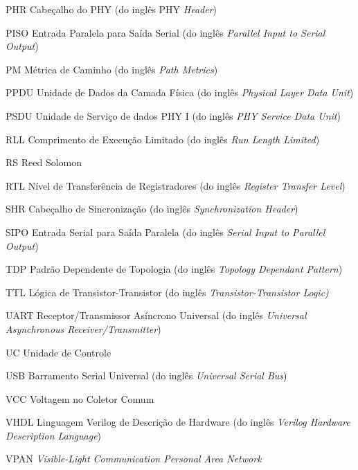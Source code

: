 \documentclass[
	12pt,				%
	openright,			%
	oneside,			%
	a4paper,			%
	hyphens,			%
	english,			%
	brazil				%
]{abntex2}
\begin{document}
\begin{siglas}
		\item[PHR] Cabeçalho do PHY (do inglês PHY \emph{Header})
		\item[PISO] Entrada Paralela para Saída Serial (do inglês \emph{Parallel Input to Serial Output})
		\item[PM] Métrica de Caminho (do inglês \emph{Path Metrics})
		\item[PPDU] Unidade de Dados da Camada Física (do inglês \emph{Physical Layer Data Unit})
		\item[PSDU] Unidade de Serviço de dados PHY I (do inglês \emph{PHY Service Data Unit})
		\item[RLL] Comprimento de Execução Limitado (do inglês \emph{Run Length Limited})
		\item[RS] Reed Solomon
		\item[RTL] Nível de Transferência de Registradores (do inglês \emph{Register Transfer Level})
		\item[SHR] Cabeçalho de Sincronização (do inglês \emph{Synchronization Header})
		\item[SIPO] Entrada Serial para Saída Paralela (do inglês \emph{Serial Input to Parallel Output})
		\item[TDP] Padrão Dependente de Topologia (do inglês \emph{Topology Dependant Pattern})
		\item[TTL] Lógica de Transistor-Transistor (do inglês \emph{Transistor-Transistor Logic)}
		\item[UART] Receptor/Transmissor Asíncrono Universal (do inglês \emph{Universal Asynchronous Receiver/Transmitter})
		\item[UC] Unidade de Controle
		\item[USB] Barramento Serial Universal (do inglês \emph{Universal Serial Bus})
		\item[VCC] Voltagem no Coletor Comum
		\item[VHDL] Linguagem Verilog de Descrição de Hardware (do inglês \emph{Verilog Hardware Description Language})
		\item[VPAN] \emph{Visible-Light Communication Personal Area Network}
	\end{siglas}

	\tableofcontents*
	\cleardoublepage

	\textual
\end{document}
